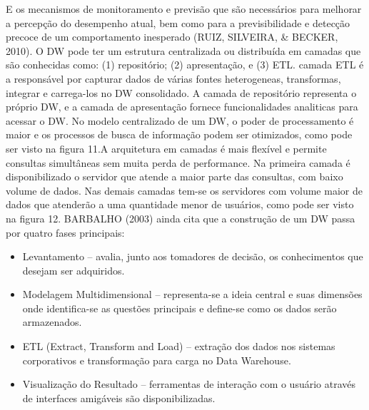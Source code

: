 E os mecanismos de monitoramento e previsão que são necessários para melhorar a percepção do desempenho atual, bem como para a previsibilidade e detecção precoce de um comportamento inesperado (RUIZ, SILVEIRA, & BECKER, 2010).
O DW pode ter um estrutura centralizada ou distribuída em camadas que são conhecidas como: (1) repositório; (2) apresentação, e (3) ETL. camada ETL é a responsável por capturar dados de várias fontes heterogeneas, transformas, integrar e carrega-los no DW consolidado. A camada de repositório representa o próprio DW, e a camada de apresentação fornece funcionalidades analiticas para acessar o DW.
No modelo centralizado de um DW, o poder de processamento é maior e os processos de busca de informação podem ser otimizados, como pode ser visto na figura 11.A arquitetura em camadas é mais flexível e permite consultas simultâneas sem muita perda de performance. Na primeira camada é disponibilizado o servidor que atende a maior parte das consultas, com baixo volume de dados. Nas demais camadas tem-se os servidores com volume maior de dados que atenderão a uma quantidade menor de usuários, como pode ser visto na figura 12.
BARBALHO (2003) ainda cita que a construção de um DW passa por quatro fases principais:
\begin{itemize}
	\item Levantamento – avalia, junto aos tomadores de decisão, os conhecimentos que desejam ser adquiridos.
	\item Modelagem Multidimensional – representa-se a ideia central e suas dimensões onde identifica-se as questões principais e define-se como os dados serão armazenados.
	\item ETL (Extract, Transform and Load) – extração dos dados nos sistemas corporativos e transformação para carga no Data Warehouse.
	\item Visualização do Resultado – ferramentas de interação com o usuário através de interfaces amigáveis são disponibilizadas.
\end{itemize}


